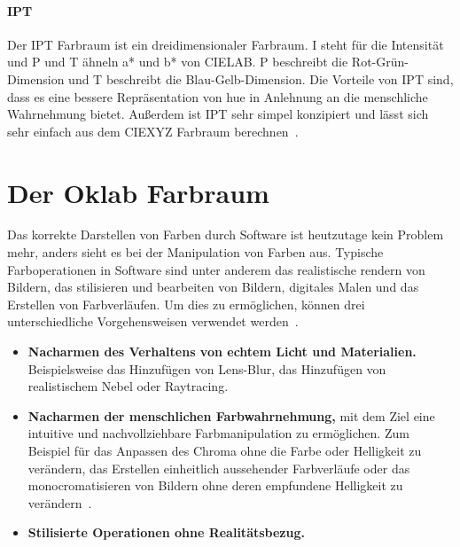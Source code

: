 \documentclass[12pt, a4paper, ngerman]{article}
\begin{document}
\paragraph{IPT}
Der \acs{IPT} Farbraum ist ein dreidimensionaler Farbraum.
I steht für die Intensität und P und T ähneln a* und b* von CIELAB. 
P beschreibt die Rot-Grün-Dimension und T beschreibt die Blau-Gelb-Dimension.
Die Vorteile von IPT sind, dass es eine bessere Repräsentation von hue 
in Anlehnung an die menschliche Wahrnehmung bietet. 
Außerdem ist IPT sehr simpel konzipiert und lässt sich sehr einfach aus dem CIEXYZ Farbraum berechnen~\cite{Ebner_1998}.

\section{Der Oklab Farbraum}
Das korrekte Darstellen von Farben durch Software ist heutzutage kein Problem mehr, 
anders sieht es bei der Manipulation von Farben aus.
Typische Farboperationen in Software sind unter anderem das realistische rendern von Bildern, 
das stilisieren und bearbeiten von Bildern, digitales Malen und das Erstellen von Farbverläufen. 
Um dies zu ermöglichen, können drei unterschiedliche Vorgehensweisen verwendet werden~\cite{Ottosson_2020}.
\begin{itemize}
  \item \textbf{Nacharmen des Verhaltens von echtem Licht und Materialien.} Beispielsweise das Hinzufügen von Lens-Blur, das Hinzufügen von realistischem Nebel oder Raytracing.
  \item \textbf{Nacharmen der menschlichen Farbwahrnehmung,} mit dem Ziel eine intuitive und nachvollziehbare Farbmanipulation zu ermöglichen. Zum Beispiel für das Anpassen des Chroma ohne die Farbe oder Helligkeit zu verändern, das Erstellen einheitlich aussehender Farbverläufe oder das monocromatisieren von Bildern ohne deren empfundene Helligkeit zu verändern~\cite{Oklab_2020}.
  \item \textbf{Stilisierte Operationen ohne Realitätsbezug.} 
\end{itemize}
\end{document}
